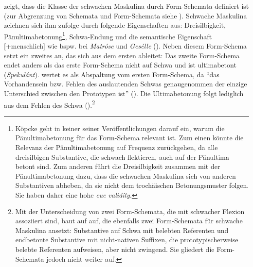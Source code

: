 \textcite{Kopcke.1993,Kopcke.1995,Kopcke.2000,Kopcke.2000b,Kopcke.2005} zeigt, dass die Klasse der schwachen Maskulina durch Form-Schemata definiert ist (zur Abgrenzung von Schemata und Form-Schemata siehe ). Schwache Maskulina zeichnen sich ihm zufolge durch folgende Eigenschaften aus: Dreisilbigkeit, Pänultimabetonung\footnote{Köpcke geht in keiner seiner Veröffentlichungen darauf ein, warum die Pänultimabetonung für das Form-Schema relevant ist. Zum einen könnte die Relevanz der Pänultimabetonung auf Frequenz zurückgehen, da alle dreisilbigen Substantive, die schwach flektieren, auch auf der Pänultima betont sind. Zum anderen führt die Dreisilbigkeit zusammen mit der Pänultimabetonung dazu, dass die schwachen Maskulina sich von anderen Substantiven abheben, da sie nicht dem trochäischen Betonungsmuster folgen. Sie haben daher eine hohe \textit{cue validity}.}, Schwa-Endung und die semantische Eigenschaft [+menschlich] wie bspw. bei \textit{Matróse} und \textit{Gesélle} (\cite[168--170]{Kopcke.1995}). Neben diesem Form-Schema setzt \textcite[174]{Kopcke.1995} ein zweites an, das sich aus dem ersten ableitet: Das zweite Form-Schema endet anders als das erste Form-Schema nicht auf Schwa und ist ultimabetont (\textit{Spekulánt}). \textcite[174]{Kopcke.1995} wertet es als Abspaltung vom ersten Form-Schema, da "`das Vorhandensein bzw. Fehlen des auslautenden Schwas genaugenommen der einzige Unterschied zwischen den Prototypen ist"' (\cite[174]{Kopcke.1995}). Die Ultimabetonung folgt lediglich aus dem Fehlen des Schwa (\cite[175]{Kopcke.1995}).\footnote{Mit der Unterscheidung von zwei Form-Schemata, die mit schwacher Flexion assoziiert sind, baut \textcite[1995]{Kopcke.1995} auf \textcite[113]{Bittner.20031991} auf, die ebenfalls zwei Form-Schemata für schwache Maskulina ansetzt: Substantive auf Schwa mit belebten Referenten und endbetonte Substantive mit nicht-nativen Suffixen, die prototypischerweise belebte Referenten aufweisen, aber nicht zwingend. Sie gliedert die Form-Schemata jedoch nicht weiter auf.} 


